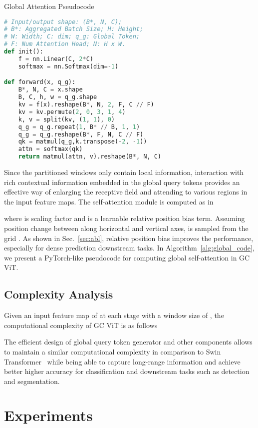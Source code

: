 \documentclass{article}
\theoremstyle{plain}
\theoremstyle{definition}
\theoremstyle{remark}
\begin{document}
\begin{minipage}{0.48\textwidth}
\begin{algorithm}[H]
\caption{Global Attention Pseudocode}
\label{alg:global_code}
\begin{lstlisting}[language=python]
# Input/output shape: (B*, N, C);
# B*: Aggregated Batch Size; H: Height;
# W: Width; C: dim; q_g: Global Token;
# F: Num Attention Head; N: H x W.
def init():
    f = nn.Linear(C, 2*C)
    softmax = nn.Softmax(dim=-1)

def forward(x, q_g):
    B*, N, C = x.shape
    B, C, h, w = q_g.shape
    kv = f(x).reshape(B*, N, 2, F, C // F)
    kv = kv.permute(2, 0, 3, 1, 4)
    k, v = split(kv, (1, 1), 0)
    q_g = q_g.repeat(1, B* // B, 1, 1)
    q_g = q_g.reshape(B*, F, N, C // F)
    qk = matmul(q_g,k.transpose(-2, -1))
    attn = softmax(qk)
    return matmul(attn, v).reshape(B*, N, C)
\end{lstlisting}
\end{algorithm}
\end{minipage}



Since the partitioned windows only contain local information, interaction with rich contextual information embedded in the global query tokens provides an effective way of enlarging the receptive field and attending to various regions in the input feature maps. The self-attention module is computed as in    






where  is scaling factor and  is a learnable relative position bias term. Assuming position change between  along horizontal and vertical axes,   is sampled from the grid . As shown in Sec.~\ref{sec:abl}, relative position bias improves the performance, especially for dense prediction downstream tasks. In Algorithm~\ref{alg:global_code}, we present a PyTorch-like pseudocode for computing global self-attention in GC ViT.

\subsection{Complexity Analysis}
Given an input feature map of  at each stage with a window size of , the computational complexity of GC ViT is as follows

The efficient design of global query token generator and other components allows to maintain a similar computational complexity in comparison to Swin Transformer~\cite{liu2021swin} while being able to capture long-range information and achieve better higher accuracy for classification and downstream tasks such as detection and segmentation. \section{Experiments}
\label{sec:exp}
\end{document}
